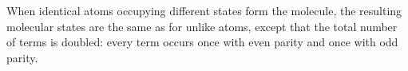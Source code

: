 When identical atoms occupying different states form the molecule, the resulting molecular states are the same as for unlike atoms, except that the total number of terms is doubled: every term occurs once with even parity and once with odd parity.
